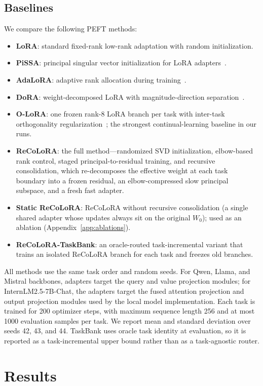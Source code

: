 \documentclass[11pt]{article}
\begin{document}
\subsection{Baselines}
We compare the following PEFT methods:
\begin{itemize}
    \item \textbf{LoRA}: standard fixed-rank low-rank adaptation with random initialization.
    \item \textbf{PiSSA}: principal singular vector initialization for LoRA adapters~\cite{meng2024pissa}.
    \item \textbf{AdaLoRA}: adaptive rank allocation during training~\cite{zhang2023adalora}.
    \item \textbf{DoRA}: weight-decomposed LoRA with magnitude-direction separation~\cite{liu2024dora}.
    \item \textbf{O-LoRA}: one frozen rank-8 LoRA branch per task with inter-task orthogonality regularization~\cite{wang2023olora}; the strongest continual-learning baseline in our runs.
    \item \textbf{ReCoLoRA}: the full method---randomized SVD initialization, elbow-based rank control, staged principal-to-residual training, and recursive consolidation, which re-decomposes the effective weight at each task boundary into a frozen residual, an elbow-compressed slow principal subspace, and a fresh fast adapter.
    \item \textbf{Static ReCoLoRA}: ReCoLoRA without recursive consolidation (a single shared adapter whose updates always sit on the original $W_0$); used as an ablation (Appendix~\ref{app:ablations}).
    \item \textbf{ReCoLoRA-TaskBank}: an oracle-routed task-incremental variant that trains an isolated ReCoLoRA branch for each task and freezes old branches.
\end{itemize}
All methods use the same task order and random seeds. For Qwen, Llama, and Mistral backbones, adapters target the query and value projection modules; for InternLM2.5-7B-Chat, the adapters target the fused attention projection and output projection modules used by the local model implementation. Each task is trained for 200 optimizer steps, with maximum sequence length 256 and at most 1000 evaluation samples per task. We report mean and standard deviation over seeds 42, 43, and 44. TaskBank uses oracle task identity at evaluation, so it is reported as a task-incremental upper bound rather than as a task-agnostic router.

\section{Results}
\end{document}
